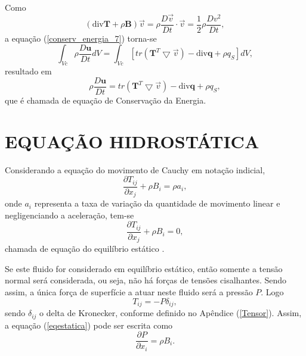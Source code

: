 Como
\begin{equation}
(\mbox{div} \textbf{T} + \rho \textbf{B}) \vec{v} = \rho \dfrac{D \vec{v}}{Dt} \cdot \vec{v} = \dfrac{1}{2} \rho \dfrac{Dv^{2}}{Dt},
\end{equation}
a equação (\ref{conserv_energia_7}) torna-se
\begin{equation}
\int_{Vc} \rho \dfrac{D \textbf{u}}{Dt} dV = \int_{Vc} [tr( \textbf{T} ^{T} \bigtriangledown \vec{v}) - \mbox{div} \textbf{q} + \rho q_{S}] dV,
\end{equation}
resultado em
\begin{equation} \label{conerv_energia_final}
\rho \dfrac{D \textbf{u}}{Dt} = tr( \textbf{T} ^{T} \bigtriangledown \vec{v}) - \mbox{div} \textbf{q} + \rho q_{S},
\end{equation} 
que é chamada de equação de Conservação da Energia.

\section{EQUAÇÃO HIDROSTÁTICA} \label{Hidro}

Considerando a equação do movimento de Cauchy em notação indicial,
\begin{equation}
\dfrac{ \partial T_{ij}}{ \partial x_{j}} + \rho B_{i}  = \rho a_{i},
\end{equation}
onde $a_{i}$ representa a taxa de variação da quantidade de movimento linear e negligenciando a aceleração, tem-se
\begin{equation} \label{eqestatica}
\dfrac{ \partial T_{ij}}{ \partial x_{j}} + \rho B_{i}  = 0,
\end{equation}
chamada de equação do equilíbrio estático \cite{Lai}.

Se este fluido for considerado em equilíbrio estático, então somente a tensão normal será considerada, ou seja, não há forças de tensões cisalhantes. Sendo assim, a única força de superfície a atuar neste fluido será a pressão $P$. Logo
\begin{equation}
T_{ij} = -P \delta_{ij},
\end{equation}
sendo $\delta_{ij}$ o delta de Kronecker, conforme definido no Apêndice (\ref{Tensor}).
Assim, a equação (\ref{eqestatica}) pode ser escrita como
\begin{equation} \label{estatica1}
\dfrac{ \partial P}{ \partial x_{i}} = \rho B_{i}.
\end{equation}

